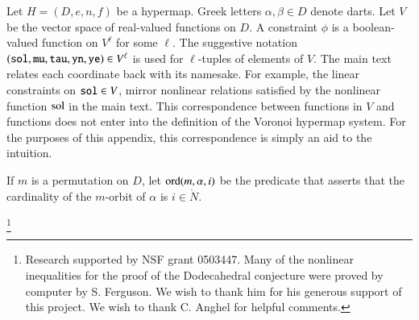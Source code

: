\documentclass{article} %
\begin{document}
Let $H=(D,e,n,f)$ be a hypermap.   Greek letters
$\alpha,\beta \in D$ denote darts.  Let $V$ be the vector space 
of real-valued  functions on $D$.  A constraint $\phi$ is a boolean-valued function on $V^\ell$ for some $\ell$.  The suggestive
notation $({\operatorname{{\texttt{sol}}}},{\operatorname{{\texttt{mu}}}},{\operatorname{{\texttt{tau}}}},{\operatorname{{\texttt{yn}}}},{\operatorname{{\texttt{ye}}}})\in V^\ell$  is used for $\ell$-tuples
of elements of $V$.  The main text relates each coordinate back
with its namesake.  For example, the linear constraints on
${\operatorname{{\texttt{sol}}}}\in V$, mirror  nonlinear relations satisfied by the
nonlinear function $\operatorname{sol}$ in the main text.  This correspondence
between functions in $V$ and functions does not enter into the
definition of the Voronoi hypermap system.  For the purposes of this
appendix, this correspondence is simply an aid to the
intuition.

If $m$ is  a permutation on $D$, let ${\operatorname{ord}}(m,\alpha,i)$
be the predicate that asserts that the cardinality of the $m$-orbit
of $\alpha$ is $i\in\ring{N}$.


\thanks{Research supported by NSF grant 0503447.   Many of the nonlinear inequalities for the proof
of the Dodecahedral conjecture were proved by computer by S. Ferguson.  We
wish to thank him for his generous support of this project. We wish to thank C. Anghel for helpful
comments.}





\end{document}
